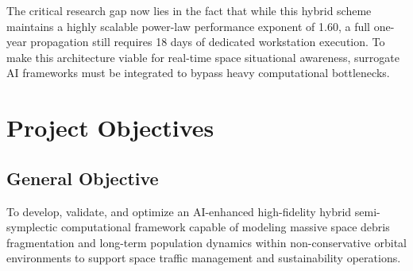 \documentclass[11pt,letterpaper]{article}
\begin{document}
The critical research gap now lies in the fact that while this hybrid scheme maintains a highly scalable power-law performance exponent of 1.60, a full one-year propagation still requires 18 days of dedicated workstation execution. To make this architecture viable for real-time space situational awareness, surrogate AI frameworks must be integrated to bypass heavy computational bottlenecks.


\section{Project Objectives}

\subsection{General Objective}
To develop, validate, and optimize an AI-enhanced high-fidelity hybrid semi-symplectic computational framework capable of modeling massive space debris fragmentation and long-term population dynamics within non-conservative orbital environments to support space traffic management and sustainability operations.
\end{document}
